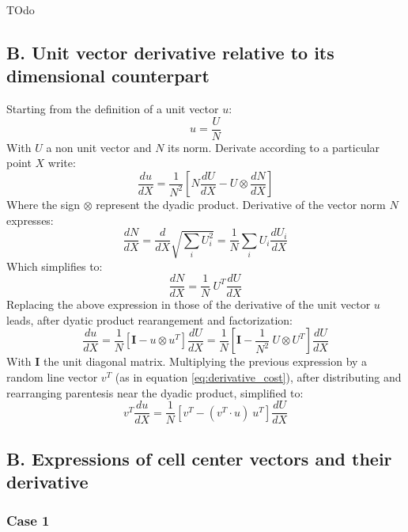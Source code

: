 \documentclass[11pt]{article}
\begin{document}
TOdo


\subsection*{B. Unit vector derivative relative to its dimensional counterpart}

Starting from the definition of a unit vector $u$:
\begin{equation}
u = \frac{U}{N}
\end{equation}
With $U$ a non unit vector and $N$ its norm.
Derivate according to a particular point $X$ write:
\begin{equation}
\frac{du}{dX} = \frac{1}{N^2} \left[ N \frac{dU}{dX} - U \otimes \frac{dN}{dX} \right]
\end{equation}
Where the sign $\otimes$ represent the dyadic product. Derivative of the vector norm $N$ expresses:
\begin{equation}
\frac{dN}{dX} = \frac{d}{dX} \sqrt{\sum_i U_i^2} =
\frac{1}{N} \sum_i U_i \frac{dU_i}{dX}
\end{equation}
Which simplifies to:
\begin{equation}
\frac{dN}{dX} = \frac{1}{N}\ U^T \frac{dU}{dX}
\end{equation}
Replacing the above expression in those of the derivative of the unit vector $u$ leads, after dyatic product rearangement and factorization:
\begin{equation}
\frac{du}{dX} = \frac{1}{N} \left[ \boldsymbol{I} - u \otimes u^T \right] \frac{dU}{dX} = \frac{1}{N} \left[ \boldsymbol{I} - \frac{1}{N^2}\ U \otimes U^T \right] \frac{dU}{dX}
\end{equation}
With $\boldsymbol{I}$ the unit diagonal matrix.
Multiplying the previous expression by a random line vector $v^T$ (as in equation \ref{eq:derivative_cost}), after distributing and rearranging parentesis near the dyadic product, simplified to:
\begin{equation}
v^T \frac{du}{dX} = \frac{1}{N} \left[ v^T - (v^T \cdot u)\ u^T \right] \frac{dU}{dX} 
\end{equation}


\subsection*{B. Expressions of cell center vectors and their derivative}

\subsubsection*{Case 1}
\end{document}
